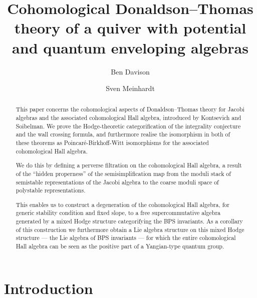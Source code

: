 \documentclass[a4paper,10pt]{amsart}
\title[CoHAs and quantum enveloping algebras]{Cohomological Donaldson--Thomas theory of a quiver with potential and quantum enveloping algebras}
\author{Ben Davison \and Sven Meinhardt}
\begin{document}
\begin{abstract}
This paper concerns the cohomological aspects of Donaldson--Thomas theory for Jacobi algebras and the associated cohomological Hall algebra, introduced by Kontsevich and Soibelman.  We prove the Hodge-theoretic categorification of the integrality conjecture and the wall crossing formula, and furthermore realise the isomorphism in both of these theorems as Poincar\'e-Birkhoff-Witt isomorphisms for the associated cohomological Hall algebra.  

We do this by defining a perverse filtration on the cohomological Hall algebra, a result of the ``hidden properness'' of the semisimplification map from the moduli stack of semistable representations of the Jacobi algebra to the coarse moduli space of polystable representations.  

This enables us to construct a degeneration of the cohomological Hall algebra, for generic stability condition and fixed slope, to a free supercommutative algebra generated by a mixed Hodge structure categorifying the BPS invariants.  As a corollary of this construction we furthermore obtain a Lie algebra structure on this mixed Hodge structure --- the Lie algebra of BPS invariants --- for which the entire cohomological Hall algebra can be seen as the positive part of a Yangian-type quantum group.
\end{abstract}

\maketitle

\tableofcontents



\section{Introduction}
\end{document}
